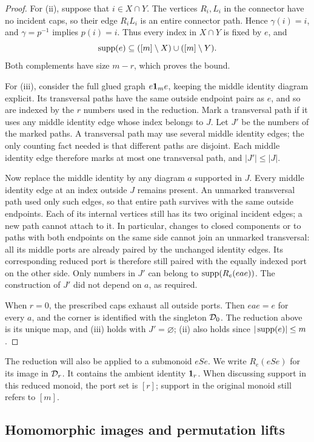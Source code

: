 \begin{proof}
For (ii), suppose that $i\in X\cap Y$.  The vertices $R_i,L_i$ in
the connector have no incident caps, so their edge $R_iL_i$ is an
entire connector path.  Hence $\gamma(i)=i$, and $\gamma=p^{-1}$
implies $p(i)=i$.  Thus every index in $X\cap Y$ is fixed by $e$,
and
\[
  \operatorname{supp}(e)\subseteq([m]\setminus X)\cup([m]\setminus Y).
\]
Both complements have size $m-r$, which proves the bound.

For (iii), consider the full glued graph $e\mathbf 1_m e$, keeping the
middle identity diagram explicit.  Its transversal paths have the same
outside endpoint pairs as $e$, and so are indexed by the $r$ numbers
used in the reduction.  Mark a transversal path if it uses any middle
identity edge whose index belongs to $J$.  Let $J'$ be the numbers of
the marked paths.  A transversal path may use several middle identity
edges; the only counting fact needed is that different paths are
disjoint.  Each middle identity edge therefore marks at most one
transversal path, and $|J'|\leq|J|$.

Now replace the middle identity by any diagram $a$ supported in $J$.
Every middle identity edge at an index outside $J$ remains present.
An unmarked transversal path used only such edges, so that entire path
survives with the same outside endpoints.  Each of its internal vertices
still has its two original incident edges; a new path cannot attach to
it.  In particular, changes to closed components or to paths with both
endpoints on the same side cannot join an unmarked transversal: all
its middle ports are already paired by the unchanged identity edges.
Its corresponding reduced port is therefore still paired with the
equally indexed port on the other side.  Only numbers in $J'$ can belong
to $\operatorname{supp}(R_e(eae))$.  The construction of $J'$ did not depend on $a$,
as required.

When $r=0$, the prescribed caps exhaust all outside ports.  Then
$eae=e$ for every $a$, and the corner is identified with the singleton
$\mathcal D_{0}$.  The reduction above is its unique map, and (iii) holds with
$J'=\varnothing$; (ii) also holds since $|\operatorname{supp}(e)|\leq m$.
\end{proof}

The reduction will also be applied to a submonoid $eSe$.  We write
$R_e(eSe)$ for its image in $\mathcal D_{r}$.  It contains the ambient identity
$\mathbf 1_r$.  When discussing support in this reduced monoid, the port
set is $[r]$; support in the original monoid still refers to $[m]$.

\subsection{Homomorphic images and permutation lifts}

